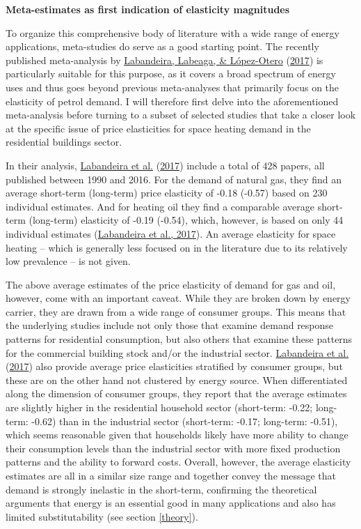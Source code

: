 \documentclass[12pt,twoside]{reedthesis}
\begin{document}
\textbf{Meta-estimates as first indication of elasticity magnitudes}

To organize this comprehensive body of literature with a wide range of energy applications, meta-studies do serve as a good starting point. The recently published meta-analysis by \protect\hyperlink{ref-labandeira_etal17}{Labandeira, Labeaga, \& López-Otero} (\protect\hyperlink{ref-labandeira_etal17}{2017}) is particularly suitable for this purpose, as it covers a broad spectrum of energy uses and thus goes beyond previous meta-analyses that primarily focus on the elasticity of petrol demand. I will therefore first delve into the aforementioned meta-analysis before turning to a subset of selected studies that take a closer look at the specific issue of price elasticities for space heating demand in the residential buildings sector.

In their analysis, \protect\hyperlink{ref-labandeira_etal17}{Labandeira et al.} (\protect\hyperlink{ref-labandeira_etal17}{2017}) include a total of 428 papers, all published between 1990 and 2016. For the demand of natural gas, they find an average short-term (long-term) price elasticity of -0.18 (-0.57) based on 230 individual estimates. And for heating oil they find a comparable average short-term (long-term) elasticity of -0.19 (-0.54), which, however, is based on only 44 individual estimates (\protect\hyperlink{ref-labandeira_etal17}{Labandeira et al., 2017}). An average elasticity for space heating -- which is generally less focused on in the literature due to its relatively low prevalence -- is not given.

The above average estimates of the price elasticity of demand for gas and oil, however, come with an important caveat. While they are broken down by energy carrier, they are drawn from a wide range of consumer groups. This means that the underlying studies include not only those that examine demand response patterns for residential consumption, but also others that examine these patterns for the commercial building stock and/or the industrial sector. \protect\hyperlink{ref-labandeira_etal17}{Labandeira et al.} (\protect\hyperlink{ref-labandeira_etal17}{2017}) also provide average price elasticities stratified by consumer groups, but these are on the other hand not clustered by energy source. When differentiated along the dimension of consumer groups, they report that the average estimates are slightly higher in the residential household sector (short-term: -0.22; long-term: -0.62) than in the industrial sector (short-term: -0.17; long-term: -0.51), which seems reasonable given that households likely have more ability to change their consumption levels than the industrial sector with more fixed production patterns and the ability to forward costs. Overall, however, the average elasticity estimates are all in a similar size range and together convey the message that demand is strongly inelastic in the short-term, confirming the theoretical arguments that energy is an essential good in many applications and also has limited substitutability (see section \ref{theory}).
\end{document}

